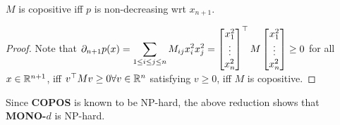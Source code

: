 \begin{enumerate}[label=(\roman*)]
\begin{cl}
$M$ is copositive iff $p$ is non-decreasing wrt $x_{n+1}$.
\end{cl}
\begin{proof}
Note that $\displaystyle\partial_{n+1}p(x) = \sum_{1\le i\le j\le n}M_{ij}x_{i}^{2}x_{j}^{2} = \begin{bmatrix}x_{1}^{2}\\\vdots\\x_{n}^{2}\end{bmatrix}^{\top}M\begin{bmatrix}x_{1}^{2}\\\vdots\\x_{n}^{2}\end{bmatrix}\ge 0$ for all $x\in\mathbb{R}^{n+1}$, iff $v^{\top}Mv\ge 0\forall v\in\mathbb{R}^{n} $ satisfying $v\ge 0$, iff $M$ is copositive.
\end{proof}
Since \textbf{COPOS} is known to be NP-hard, the above reduction shows that \textbf{MONO-$d$} is NP-hard.
\end{enumerate}

